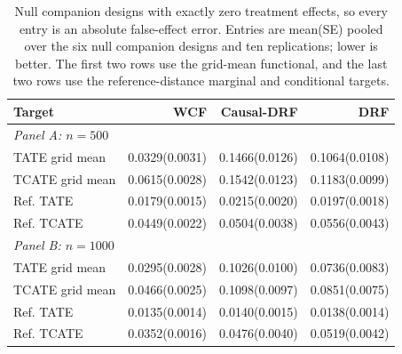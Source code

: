 \begin{table}[t]
\centering
\scriptsize
\setlength{\tabcolsep}{3pt}
\caption{Null companion designs with exactly zero treatment effects, so every entry is an absolute false-effect error. Entries are mean(SE) pooled over the six null companion designs and ten replications; lower is better. The first two rows use the grid-mean functional, and the last two rows use the reference-distance marginal and conditional targets.}
\label{tab:sensitivity-placebo}
\begin{tabular}{lrrr}
\toprule
Target & WCF & Causal-DRF & DRF \\
\midrule
\multicolumn{4}{l}{\textit{Panel A: $n=500$}} \\
\midrule
TATE grid mean & 0.0329(0.0031) & 0.1466(0.0126) & 0.1064(0.0108) \\
TCATE grid mean & 0.0615(0.0028) & 0.1542(0.0123) & 0.1183(0.0099) \\
Ref. TATE & 0.0179(0.0015) & 0.0215(0.0020) & 0.0197(0.0018) \\
Ref. TCATE & 0.0449(0.0022) & 0.0504(0.0038) & 0.0556(0.0043) \\
\multicolumn{4}{l}{\textit{Panel B: $n=1000$}} \\
\midrule
TATE grid mean & 0.0295(0.0028) & 0.1026(0.0100) & 0.0736(0.0083) \\
TCATE grid mean & 0.0466(0.0025) & 0.1098(0.0097) & 0.0851(0.0075) \\
Ref. TATE & 0.0135(0.0014) & 0.0140(0.0015) & 0.0138(0.0014) \\
Ref. TCATE & 0.0352(0.0016) & 0.0476(0.0040) & 0.0519(0.0042) \\
\bottomrule
\end{tabular}
\end{table}
